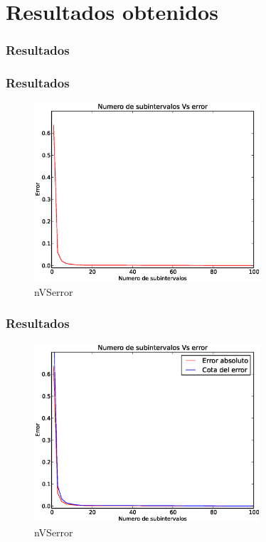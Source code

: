 \documentclass{beamer}
\begin{document}
\section{Resultados obtenidos}
\begin{frame}
  \frametitle{Resultados}
  
\end{frame}

\begin{frame}
  \frametitle{Resultados}
  \begin{figure}[!th]
    \begin{center}
      \includegraphics[width=0.75\textwidth]{img/Plot_nVSerror.eps}
      \caption{nVSerror}
      \label{fig:1}
    \end{center}
  \end{figure}
\end{frame}

\begin{frame}
  \frametitle{Resultados}
  \begin{figure}[!th]
    \begin{center}
      \includegraphics[width=0.75\textwidth]{img/Plot_nVSerrorAndcota.eps}
      \caption{nVSerror}
      \label{fig:1}
    \end{center}
  \end{figure}
\end{frame}
\end{document}

